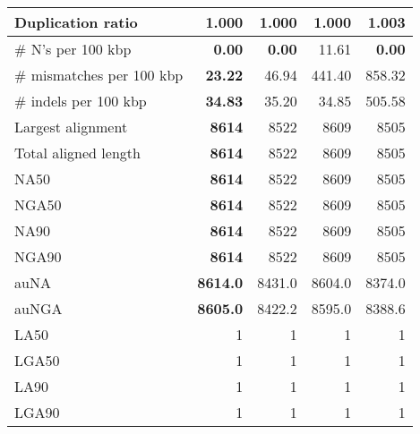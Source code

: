 \documentclass[12pt,a4paper]{article}
\begin{document}
\begin{table}[ht]
\begin{center}
\begin{tabular}{|l*{4}{|r}|}
Duplication ratio & {\bf 1.000} & {\bf 1.000} & {\bf 1.000} & 1.003 \\ \hline
\# N's per 100 kbp & {\bf 0.00} & {\bf 0.00} & 11.61 & {\bf 0.00} \\ \hline
\# mismatches per 100 kbp & {\bf 23.22} & 46.94 & 441.40 & 858.32 \\ \hline
\# indels per 100 kbp & {\bf 34.83} & 35.20 & 34.85 & 505.58 \\ \hline
Largest alignment & {\bf 8614} & 8522 & 8609 & 8505 \\ \hline
Total aligned length & {\bf 8614} & 8522 & 8609 & 8505 \\ \hline
NA50 & {\bf 8614} & 8522 & 8609 & 8505 \\ \hline
NGA50 & {\bf 8614} & 8522 & 8609 & 8505 \\ \hline
NA90 & {\bf 8614} & 8522 & 8609 & 8505 \\ \hline
NGA90 & {\bf 8614} & 8522 & 8609 & 8505 \\ \hline
auNA & {\bf 8614.0} & 8431.0 & 8604.0 & 8374.0 \\ \hline
auNGA & {\bf 8605.0} & 8422.2 & 8595.0 & 8388.6 \\ \hline
LA50 & 1 & 1 & 1 & 1 \\ \hline
LGA50 & 1 & 1 & 1 & 1 \\ \hline
LA90 & 1 & 1 & 1 & 1 \\ \hline
LGA90 & 1 & 1 & 1 & 1 \\ \hline
\end{tabular}
\end{center}
\end{table}
\end{document}

